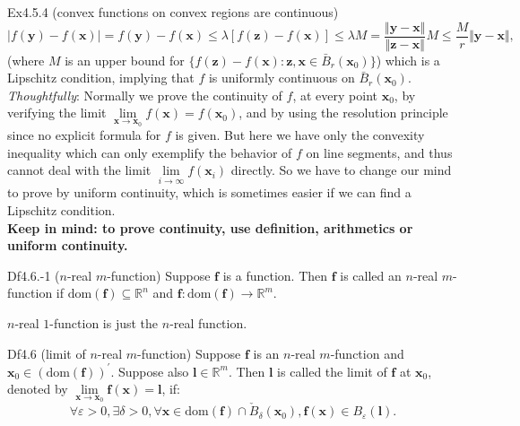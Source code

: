 \documentclass{article}
\begin{document}
\begin{Th}{Ex4.5.4 (convex functions on convex regions are continuous)}
    $$ |f(\pmb{y}) - f(\pmb{x})| = f(\pmb{y}) - f(\pmb{x}) \leq \lambda [f(\pmb{z})-f(\pmb{x})] \leq \lambda M = \frac{\Vert\pmb{y}-\pmb{x}\Vert}{\Vert\pmb{z}-\pmb{x}\Vert}M\leq \frac{M}{r}\Vert\pmb{y}-\pmb{x}\Vert, $$
    (where $M$ is an upper bound for $\{f(\pmb{z}) - f(\pmb{x}): \pmb{z}, \pmb{x}\in\bar{B}_r(\pmb{x}_0)\}$) which is a Lipschitz condition, implying that $f$ is uniformly continuous on $\bar{B}_r(\pmb{x}_0)$.\\
    \textcolor{P}{\textit{Thoughtfully}: Normally we prove the continuity of $f$, at every point $\pmb{x}_0$, by verifying the limit $\lim\limits_{\pmb{x}\to\pmb{x}_0} f(\pmb{x}) = f(\pmb{x}_0)$, and by using the resolution principle since no explicit formula for $f$ is given. But here we have only the convexity inequality which can only exemplify the behavior of $f$ on line segments, and thus cannot deal with the limit $\lim\limits_{i\to \infty} f(\pmb{x}_i)$ directly. So we have to change our mind to prove by uniform continuity, which is sometimes easier if we can find a Lipschitz condition.\\
    \textbf{Keep in mind: to prove continuity, use definition, arithmetics or uniform continuity.}}
\end{Th}

\begin{Df}{Df4.6.-1 ($n$-real $m$-function)}
    Suppose $\pmb{f}$ is a function. Then $\pmb{f}$ is called an $n$-real $m$-function if $\text{dom}(\pmb{f})\subseteq\mathbb{R}^n$ and $\pmb{f}: \text{dom}(\pmb{f})\rightarrow\mathbb{R}^m$.
\end{Df}

\begin{Rmk}{}
    $n$-real $1$-function is just the $n$-real function.
\end{Rmk}

\begin{Df}{Df4.6 (limit of $n$-real $m$-function)}
    Suppose $\pmb{f}$ is an $n$-real $m$-function and $\pmb{x}_0\in(\text{dom}(\pmb{f}))^\prime$. Suppose also $\pmb{l}\in\mathbb{R}^m$. Then $\pmb{l}$ is called the limit of $\pmb{f}$ at $\pmb{x}_0$, denoted by $\lim\limits_{\pmb{x}\to\pmb{x}_0}\pmb{f}(\pmb{x}) = \pmb{l}$, if:
    $$ \forall\varepsilon>0, \exists\delta>0, \forall\pmb{x}\in\text{dom}(\pmb{f})\cap \check{B}_\delta(\pmb{x}_0), \pmb{f}(\pmb{x})\in B_\varepsilon(\pmb{l}). $$
\end{Df}
\end{document}
